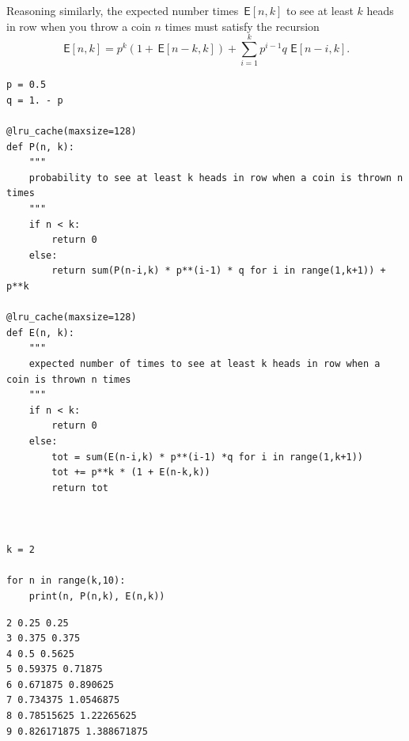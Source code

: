 \documentclass[a4paper]{article}
\newcommand{\E}[1]{\,\mathsf{E}\left[#1\right]}
\begin{document}
Reasoning similarly, the expected number times \(\E{n,k}\) to see at least \(k\) heads in row when you throw a coin \(n\) times must satisfy the recursion
$$\E{n,k} = p^k(1+\E{n-k,k}) + \sum_{i=1}^k p^{i-1} q\, \E{n-i,k}.$$


\begin{verbatim}
p = 0.5
q = 1. - p

@lru_cache(maxsize=128)
def P(n, k):
    """
    probability to see at least k heads in row when a coin is thrown n times
    """
    if n < k:
        return 0
    else:
        return sum(P(n-i,k) * p**(i-1) * q for i in range(1,k+1)) + p**k

@lru_cache(maxsize=128)
def E(n, k):
    """
    expected number of times to see at least k heads in row when a coin is thrown n times
    """
    if n < k:
        return 0
    else:
        tot = sum(E(n-i,k) * p**(i-1) *q for i in range(1,k+1))
        tot += p**k * (1 + E(n-k,k))
        return tot



k = 2

for n in range(k,10):
    print(n, P(n,k), E(n,k))
\end{verbatim}

\begin{verbatim}
2 0.25 0.25
3 0.375 0.375
4 0.5 0.5625
5 0.59375 0.71875
6 0.671875 0.890625
7 0.734375 1.0546875
8 0.78515625 1.22265625
9 0.826171875 1.388671875
\end{verbatim}
\end{document}
